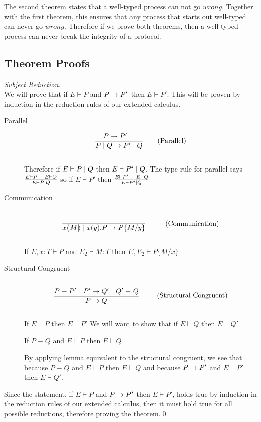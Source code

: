The second theorem states that a well-typed process can not go $wrong$. Together with the first theorem, this ensures that any process that starts out well-typed can never go $wrong$. Therefore if we prove both theorems, then a well-typed process can never break the integrity of a protocol.
\subsection{Theorem Proofs}
\begin{proof}[Subject Reduction]\\
	We will prove that if $E \vdash P$ and $P\rightarrow P'$ then $E \vdash P'$. This will be proven by induction in the reduction rules of our extended calculus.
	\begin{description}
	\item[Parallel]
		\begin{align*}
		\frac{P \rightarrow P' \quad}{P \mid Q \rightarrow P' \mid Q} \tag{Parallel}
		\end{align*}\\
		
		Therefore if $E \vdash P \mid Q$ then $E \vdash P' \mid Q$. The type rule for parallel says $\frac{E \vdash P\quad E \vdash Q}{E \vdash P \mid Q}$ so if $E \vdash P'$ then $\frac{E \vdash P' \quad E \vdash Q}{E \vdash P' \mid Q}$\\
	\item[Communication]
		\begin{align*}
		\infrule{}{\lift{x}{M}\para\inp{x}{y}P\ra P\{M/y\}} \tag{Communication}
		\end{align*}
		
		\begin{lemma}[Substitution]
			If $E,x:T \vdash P$ and $E_2 \vdash M:T$ then $E, E_2 \vdash P\{M/x \}$
		\end{lemma}
	\item[Structural Congruent]
		\begin{align*}
		\infrule{P \equiv P' \quad P' \ra Q' \quad Q' \equiv Q}{P \ra Q} \tag{Structural Congruent}
		\end{align*}
		
		
		If $E \vdash P$ then $E \vdash P'$ We will want to show that if $E \vdash Q$ then $E \vdash Q'$
		
		\begin{lemma}[Equivalent]
			If $P \equiv Q$ and $E \vdash P$ then $E \vdash Q$
		\end{lemma}
		
		By applying lemma equivalent to the structural congruent, we see that because $P \equiv Q$ and $E \vdash P$ then $E \vdash Q$ and because $P \rightarrow P'$ and $E \vdash P'$ then $E \vdash Q'$.
	\end{description}
	Since the statement, if $E \vdash P$ and $P\rightarrow P'$ then $E \vdash P'$, holds true by induction in the reduction rules of our extended calculus, then it must hold true for all possible reductions, therefore proving the theorem.\qed
\end{proof}
